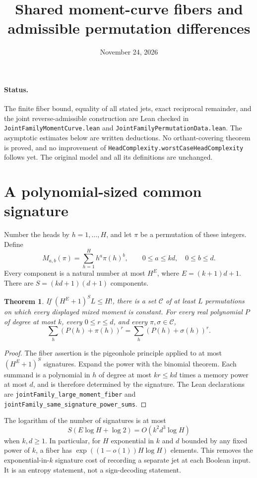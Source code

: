 \documentclass{article}
\newtheorem{theorem}{Theorem}
\begin{document}
\title{Shared moment-curve fibers and admissible permutation differences}
\author{}
\date{November 24, 2026}
\maketitle

\paragraph{Status.}
The finite fiber bound, equality of all stated jets, exact reciprocal
remainder, and the joint reverse-admissible construction are Lean checked
in \texttt{JointFamilyMomentCurve.lean} and
\texttt{JointFamilyPermutationData.lean}. The asymptotic estimates below
are written deductions. No orthant-covering theorem is proved, and no
improvement of \texttt{HeadComplexity.worstCaseHeadComplexity} follows
yet. The original model and all its definitions are unchanged.

\section{A polynomial-sized common signature}
Number the heads by $h=1,\ldots,H$, and let $\pi$ be a permutation of
these integers. Define
\[
 M_{a,b}(\pi)=\sum_{h=1}^H h^a\pi(h)^b,
 \qquad 0\leq a\leq kd,\quad 0\leq b\leq d.
\]
Every component is a natural number at most $H^E$, where
$E=(k+1)d+1$. There are $S=(kd+1)(d+1)$ components.

\begin{theorem}
If $(H^E+1)^S L\leq H!$, there is a set $\mathcal C$ of at least
$L$ permutations on which every displayed mixed moment is constant.
For every real polynomial $P$ of degree at most $k$, every
$0\leq r\leq d$, and every $\pi,\sigma\in\mathcal C$,
\[
 \sum_h(P(h)+\pi(h))^r=\sum_h(P(h)+\sigma(h))^r.
\]
\end{theorem}
\begin{proof}
The fiber assertion is the pigeonhole principle applied to at most
$(H^E+1)^S$ signatures. Expand the power with the binomial theorem.
Each summand is a polynomial in $h$ of degree at most $kr\leq kd$
times a memory power at most $d$, and is therefore determined by the
signature. The Lean declarations are
\texttt{jointFamily\_large\_moment\_fiber} and
\texttt{jointFamily\_same\_signature\_power\_sums}.
\end{proof}

The logarithm of the number of signatures is at most
\[
 S(E\log H+\log 2)=O(k^2d^3\log H)
\]
when $k,d\geq1$. In particular, for $H$ exponential in $k$ and $d$
bounded by any fixed power of $k$, a fiber has
$\exp((1-o(1))H\log H)$ elements. This removes the exponential-in-$k$
signature cost of recording a separate jet at each Boolean input.
It is an entropy statement, not a sign-decoding statement.
\end{document}

